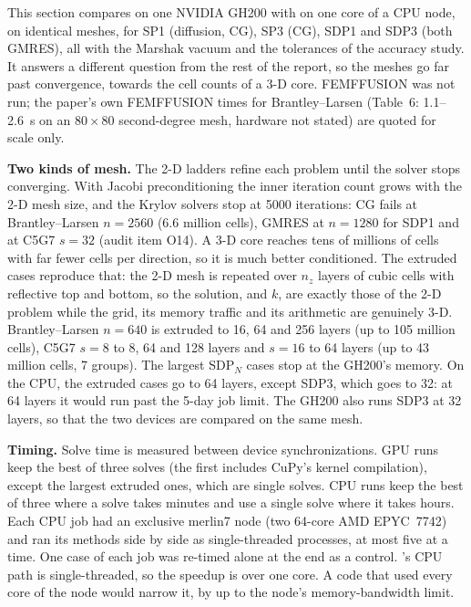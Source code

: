 This section compares \garnet{} on one NVIDIA GH200 with \garnet{} on one core
of a CPU node, on identical meshes, for SP1 (diffusion, CG), SP3 (CG), SDP1
and SDP3 (both GMRES), all with the Marshak vacuum and the tolerances of the
accuracy study. It answers a different question from the rest of the report,
so the meshes go far past convergence, towards the cell counts of a 3-D core.
FEMFFUSION was not run; the paper's own FEMFFUSION times for Brantley--Larsen
(Table~6: 1.1--2.6~s on an $80 \times 80$ second-degree mesh, hardware not
stated) are quoted for scale only.

\textbf{Two kinds of mesh.} The 2-D ladders refine each problem until the
solver stops converging. With Jacobi preconditioning the inner iteration count
grows with the 2-D mesh size, and the Krylov solvers stop at 5000 iterations:
CG fails at Brantley--Larsen $n = 2560$ (6.6 million cells), GMRES at
$n = 1280$ for SDP1 and at C5G7 $s = 32$ (audit item O14). A 3-D core reaches
tens of millions of cells with far fewer cells per direction, so it is much
better conditioned. The extruded cases reproduce that: the 2-D mesh is
repeated over $n_z$ layers of cubic cells with reflective top and bottom, so
the solution, and $k$, are exactly those of the 2-D problem while the grid,
its memory traffic and its arithmetic are genuinely 3-D. Brantley--Larsen
$n = 640$ is extruded to 16, 64 and 256 layers (up to 105 million cells), C5G7
$s = 8$ to 8, 64 and 128 layers and $s = 16$ to 64 layers (up to 43 million
cells, 7 groups). The largest SDP$_N$ cases stop at the GH200's memory. On the
CPU, the extruded cases go to 64 layers, except SDP3, which goes to 32: at
64 layers it would run past the 5-day job limit. The GH200 also runs SDP3 at
32 layers, so that the two devices are compared on the same mesh.

\textbf{Timing.} Solve time is measured between device synchronizations. GPU
runs keep the best of three solves (the first includes CuPy's kernel
compilation), except the largest extruded ones, which are single solves. CPU
runs keep the best of three where a solve takes minutes and use a single solve
where it takes hours. Each CPU job had an exclusive merlin7 node (two
64-core AMD EPYC~7742) and ran its methods side by side as single-threaded
processes, at most five at a time. One case of each job was re-timed alone at
the end as a control. \garnet's CPU path is
single-threaded, so the speedup is over one core. A code that used every core
of the node would narrow it, by up to the node's memory-bandwidth limit.
